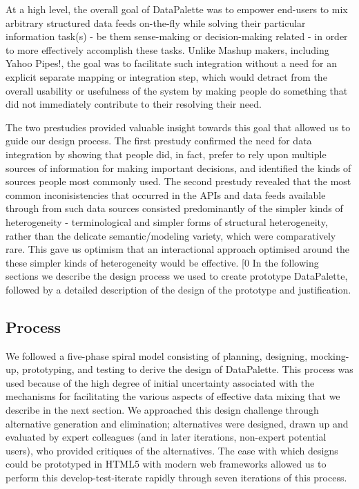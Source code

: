 \documentclass{sigchi}
\begin{document}
At a high level, the overall goal of DataPalette was to empower end-users to mix arbitrary structured data feeds on-the-fly while solving their particular information task(s) - be them sense-making or decision-making related - in order to more effectively accomplish these tasks.  Unlike Mashup makers, including Yahoo Pipes!, the goal was to facilitate such integration without a need for an explicit separate mapping or integration step, which would detract from the overall usability or usefulness of the system by making people do something that did not immediately contribute to their resolving their need.

The two prestudies provided valuable insight towards this goal that allowed us to guide our design process. The first prestudy confirmed the need for data integration by showing that people did, in fact, prefer to rely upon multiple sources of information for making important decisions, and identified the kinds of sources people most commonly used.  The second prestudy revealed that the most common inconisistencies that occurred in the APIs and data feeds available through from such data sources consisted predominantly of the simpler kinds of heterogeneity - terminological and simpler forms of structural heterogeneity, rather than the delicate semantic/modeling variety, which were comparatively rare. This gave us optimism that an interactional approach optimised around the these simpler kinds of heterogeneity would be effective.
[0
In the following sections we describe the design process we used to create prototype DataPalette, followed by a detailed description of the design of the prototype and justification.

\subsection{Process}
We followed a five-phase spiral model consisting of planning, designing, mocking-up, prototyping, and testing to derive the design of DataPalette.  This process was used because of the high degree of initial uncertainty associated with the mechanisms for facilitating the various aspects of effective data mixing that we describe in the next section. We approached this design challenge through alternative generation and elimination; alternatives were designed, drawn up and evaluated by expert colleagues (and in later iterations, non-expert potential users), who provided critiques of the alternatives. The ease with which designs could be prototyped in HTML5 with modern web frameworks allowed us to perform this develop-test-iterate rapidly through seven iterations of this process.
\end{document}

